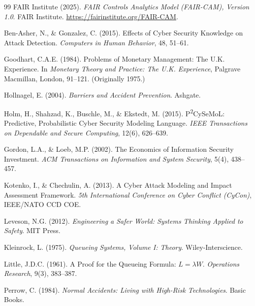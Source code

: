 \documentclass[11pt,a4paper]{article}
\begin{document}
\begin{thebibliography}{99}
FAIR Institute (2025).
\newblock \emph{FAIR Controls Analytics Model (FAIR-CAM), Version 1.0}.
\newblock FAIR Institute. \url{https://fairinstitute.org/FAIR-CAM}.

Ben-Asher, N., \& Gonzalez, C. (2015).
\newblock Effects of Cyber Security Knowledge on Attack Detection.
\newblock \emph{Computers in Human Behavior}, 48, 51--61.

Goodhart, C.A.E. (1984).
\newblock Problems of Monetary Management: The U.K. Experience.
\newblock In \emph{Monetary Theory and Practice: The U.K. Experience}, Palgrave Macmillan, London, 91--121. (Originally 1975.)

Hollnagel, E. (2004).
\newblock \emph{Barriers and Accident Prevention}.
\newblock Ashgate.

Holm, H., Shahzad, K., Buschle, M., \& Ekstedt, M. (2015).
\newblock P\textsuperscript{2}CySeMoL: Predictive, Probabilistic Cyber Security Modeling Language.
\newblock \emph{IEEE Transactions on Dependable and Secure Computing}, 12(6), 626--639.

Gordon, L.A., \& Loeb, M.P. (2002).
\newblock The Economics of Information Security Investment.
\newblock \emph{ACM Transactions on Information and System Security}, 5(4), 438--457.

Kotenko, I., \& Chechulin, A. (2013).
\newblock A Cyber Attack Modeling and Impact Assessment Framework.
\newblock \emph{5th International Conference on Cyber Conflict (CyCon)}, IEEE/NATO CCD COE.

Leveson, N.G. (2012).
\newblock \emph{Engineering a Safer World: Systems Thinking Applied to Safety}.
\newblock MIT Press.

Kleinrock, L. (1975).
\newblock \emph{Queueing Systems, Volume I: Theory}.
\newblock Wiley-Interscience.

Little, J.D.C. (1961).
\newblock A Proof for the Queueing Formula: $L = \lambda W$.
\newblock \emph{Operations Research}, 9(3), 383--387.

Perrow, C. (1984).
\newblock \emph{Normal Accidents: Living with High-Risk Technologies}.
\newblock Basic Books.


\end{thebibliography}
\end{document}
